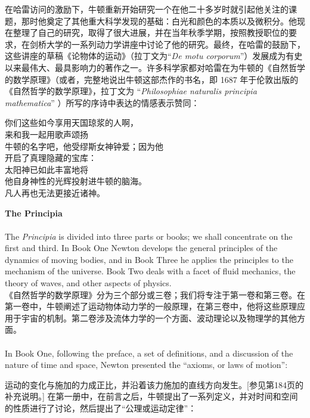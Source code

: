 \documentclass{article}
\begin{document}
\addtolength{\leftskip}{-1cm}

\noindent 在哈雷访问的激励下，牛顿重新开始研究一个在他二十多岁时就引起他关注的课题，那时他奠定了其他重大科学发现的基础：白光和颜色的本质以及微积分。他现在整理了自己的研究，取得了很大进展，并在当年秋季学期，按照教授职位的要求，在剑桥大学的一系列动力学讲座中讨论了他的研究。最终，在哈雷的鼓励下，这些讲座的草稿《论物体的运动》（拉丁文为“\textit{De motu corporum}”）发展成为有史以来最伟大、最具影响力的著作之一。许多科学家都对哈雷在为牛顿的《自然哲学的数学原理》（或者，完整地说出牛顿这部杰作的书名，即 1687 年于伦敦出版的《自然哲学的数学原理》，拉丁文为 “\textit{Philosophiae naturalis principia mathematica}” ）所写的序诗中表达的情感表示赞同：\\

\addtolength{\leftskip}{1cm}

\noindent 你们这些如今享用天国琼浆的人啊，\\
来和我一起用歌声颂扬\\
牛顿的名字吧，他受缪斯女神钟爱；因为他\\
开启了真理隐藏的宝库：\\
太阳神已如此丰富地将\\
他自身神性的光辉投射进牛顿的脑海。\\
凡人再也无法更接近诸神。 \\

\addtolength{\leftskip}{-1cm}

\noindent\textbf{The Principia}\\
\\
The \textit{Principia} is divided into three parts or books; we shall concentrate on the first and third. In Book One Newton develops the general principles of the dynamics of moving bodies, and in Book Three he applies the principles to the mechanism of the universe. Book Two deals with a facet of fluid mechanics, the theory of waves, and other aspects of physics.\\
《自然哲学的数学原理》分为三个部分或三卷；我们将专注于第一卷和第三卷。在第一卷中，牛顿阐述了运动物体动力学的一般原理，在第三卷中，他将这些原理应用于宇宙的机制。第二卷涉及流体力学的一个方面、波动理论以及物理学的其他方面。 \\

\\
In Book One, following the preface, a set of definitions, and a discussion of the nature of time and space, Newton presented the ``axioms, or laws of motion'':

\noindent 运动的变化与施加的力成正比，并沿着该力施加的直线方向发生。[参见第184页的补充说明。]
在第一册中，在前言之后，牛顿提出了一系列定义，并对时间和空间的性质进行了讨论，然后提出了“公理或运动定律”：
\end{document}
